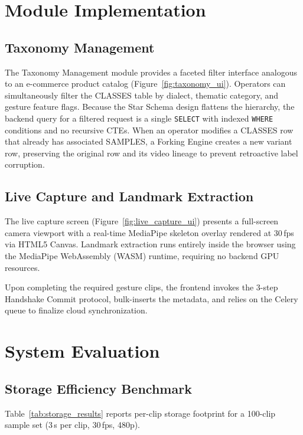\section{Module Implementation}

\subsection{Taxonomy Management}
The Taxonomy Management module provides a faceted filter interface analogous to an e-commerce product catalog (Figure~\ref{fig:taxonomy_ui}). Operators can simultaneously filter the CLASSES table by dialect, thematic category, and gesture feature flags.
Because the Star Schema design flattens the hierarchy, the backend query for a filtered request is a single \texttt{SELECT} with indexed \texttt{WHERE} conditions and no recursive CTEs. When an operator modifies a CLASSES row that already has associated SAMPLES, a Forking Engine creates a new variant row, preserving the original row and its video lineage to prevent retroactive label corruption.


\subsection{Live Capture and Landmark Extraction}
The live capture screen (Figure~\ref{fig:live_capture_ui}) presents a full-screen camera viewport with a real-time MediaPipe skeleton overlay rendered at 30\,fps via HTML5 Canvas. Landmark extraction runs entirely inside the browser using the MediaPipe WebAssembly (WASM) runtime, requiring no backend GPU resources.


Upon completing the required gesture clips, the frontend invokes the 3-step Handshake Commit protocol, bulk-inserts the metadata, and relies on the Celery queue to finalize cloud synchronization.

\section{System Evaluation}

\subsection{Storage Efficiency Benchmark}
Table~\ref{tab:storage_results} reports per-clip storage footprint for a 100-clip sample set (3\,s per clip, 30\,fps, 480p).

